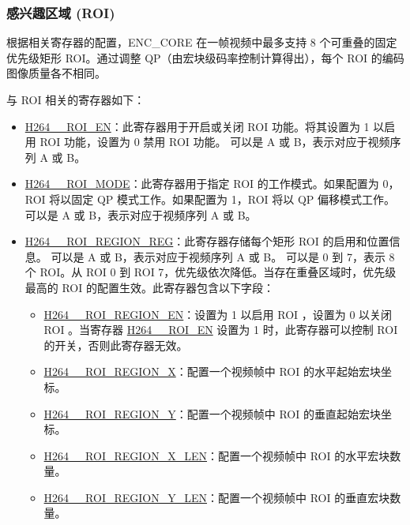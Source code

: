 \documentclass[main\_\_CN.tex]{subfiles}
\begin{document}
\subsubsection{感兴趣区域 (ROI)}\label{sec:h264-roi}
根据相关寄存器的配置，ENC\_CORE 在一帧视频中最多支持 8 个可重叠的固定优先级矩形 ROI。通过调整 QP（由宏块级码率控制计算得出），每个 ROI 的编码图像质量各不相同。

与 ROI 相关的寄存器如下：
\begin{itemize}
    \item \hyperref[fielddesc:H264AROIEN]{H264\_\_ROI\_EN}：此寄存器用于开启或关闭 ROI 功能。将其设置为 1 以启用 ROI 功能，设置为 0 禁用 ROI 功能。 可以是 A 或 B，表示对应于视频序列 A 或 B。
    \item \hyperref[fielddesc:H264AROIMODE]{H264\_\_ROI\_MODE}：此寄存器用于指定 ROI 的工作模式。如果配置为 0，ROI 将以固定 QP 模式工作。如果配置为 1，ROI 将以 QP 偏移模式工作。 可以是 A 或 B，表示对应于视频序列 A 或 B。
    \item \hyperref[regdesc:H264AROIREGION0REG]{H264\_\_ROI\_REGION\_REG}：此寄存器存储每个矩形 ROI 的启用和位置信息。 可以是 A 或 B，表示对应于视频序列 A 或 B。 可以是 0 到 7，表示 8 个 ROI。从 ROI 0 到 ROI 7，优先级依次降低。当存在重叠区域时，优先级最高的 ROI 的配置生效。此寄存器包含以下字段：
        \begin{itemize}
            \item \hyperref[fielddesc:H264AROIREGION0EN]{H264\_\_ROI\_REGION\_EN}：设置为 1 以启用 ROI ，设置为 0 以关闭 ROI 。当寄存器 \hyperref[fielddesc:H264AROIEN]{H264\_\_ROI\_EN} 设置为 1 时，此寄存器可以控制 ROI  的开关，否则此寄存器无效。
            \item \hyperref[fielddesc:H264AROIREGION0X]{H264\_\_ROI\_REGION\_X}：配置一个视频帧中 ROI  的水平起始宏块坐标。
            \item \hyperref[fielddesc:H264AROIREGION0Y]{H264\_\_ROI\_REGION\_Y}：配置一个视频帧中 ROI  的垂直起始宏块坐标。
            \item \hyperref[fielddesc:H264AROIREGION0XLEN]{H264\_\_ROI\_REGION\_X\_LEN}：配置一个视频帧中 ROI  的水平宏块数量。
            \item \hyperref[fielddesc:H264AROIREGION0YLEN]{H264\_\_ROI\_REGION\_Y\_LEN}：配置一个视频帧中 ROI  的垂直宏块数量。

\end{itemize}
\end{itemize}
\end{document}
